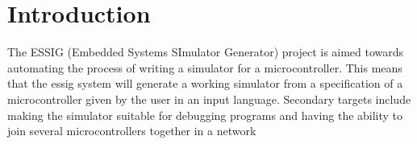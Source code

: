 \chapter{Introduction}
The ESSIG (Embedded Systems SImulator Generator) project is aimed
towards automating the process of writing a simulator for a
microcontroller. This means that the essig system will generate a
working simulator from a specification of a microcontroller given by
the user in an input language. Secondary targets include making the
simulator suitable for debugging programs and having the ability to
join several microcontrollers together in a network
